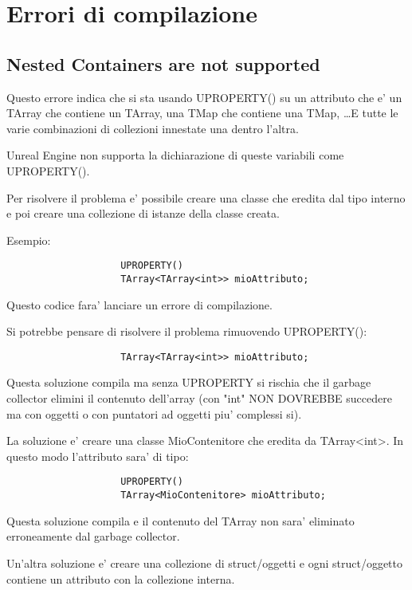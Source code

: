     \section{Errori di compilazione}

        \subsection{Nested Containers are not supported}
            Questo errore indica che si sta usando UPROPERTY() su un attributo che e' un TArray che contiene un TArray, una TMap che contiene una TMap, \dots E tutte le varie combinazioni di collezioni innestate una dentro l'altra.

            Unreal Engine non supporta la dichiarazione di queste variabili come UPROPERTY().

            Per risolvere il problema e' possibile creare una classe che eredita dal tipo interno e poi creare una collezione di istanze della classe creata.

            \begin{notebox}
                Esempio:

                \begin{verbatim}
                    UPROPERTY()
                    TArray<TArray<int>> mioAttributo;
                \end{verbatim}

                Questo codice fara' lanciare un errore di compilazione.

                Si potrebbe pensare di risolvere il problema rimuovendo UPROPERTY():

                \begin{verbatim}
                    TArray<TArray<int>> mioAttributo;
                \end{verbatim}

                Questa soluzione compila ma senza UPROPERTY si rischia che il garbage collector elimini il contenuto dell'array (con "int" NON DOVREBBE succedere ma con oggetti o con puntatori ad oggetti piu' complessi si).

                La soluzione e' creare una classe MioContenitore che eredita da TArray<int>. In questo modo l'attributo sara' di tipo:
                \begin{verbatim}
                    UPROPERTY()
                    TArray<MioContenitore> mioAttributo;
                \end{verbatim}

                Questa soluzione compila e il contenuto del TArray non sara' eliminato erroneamente dal garbage collector.
            \end{notebox}

            Un'altra soluzione e' creare una collezione di struct/oggetti e ogni struct/oggetto contiene un attributo con la collezione interna.
